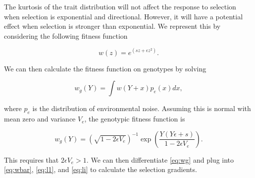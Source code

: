 The kurtosis of the trait distribution will not affect the response to selection
when selection is exponential and directional. However, it will have a potential
effect when selection is stronger than exponential. We represent this by
considering the following fitness function

\begin{equation}
  w(z) = e^{(sz + \epsilon z^2)}.
\end{equation}

We can then calculate the fitness function on genotypes by solving

\begin{equation*}
  w_g(Y) = \int w(Y + x)p_e(x)dx,
\end{equation*}

where $p_e$ is the distribution of environmental noise. Assuming this is normal
with mean zero and variance $V_e$, the genotypic fitness function is

\begin{equation}
  \label{eq:wg}
  w_g(Y) = \left( \sqrt{1-2\epsilon V_e} \right)^{-1}
  \exp\left( \frac{Y(Y\epsilon + s)}{1-2\epsilon V_e}\right).
\end{equation}

This requires that $2\epsilon V_e > 1$. We can then differentiate \eqref{eq:wg}
and plug into \eqref{eq:wbar}, \eqref{eq:l1}, and \eqref{eq:li} to calculate the
selection gradients. 


